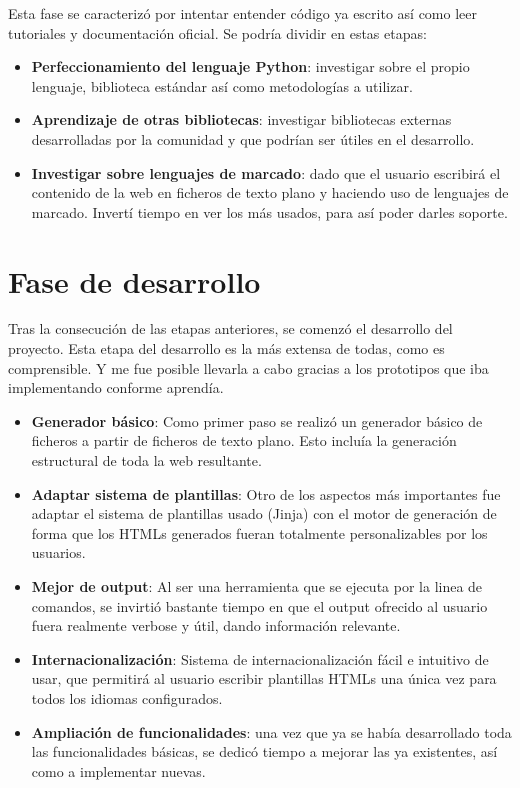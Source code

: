 Esta fase se caracterizó por intentar entender código ya escrito así como leer tutoriales y documentación
oficial. Se podría dividir en estas etapas:

\begin{itemize}
\item \textbf{Perfeccionamiento del lenguaje Python}: investigar sobre el propio lenguaje, biblioteca estándar
así como metodologías a utilizar.
\item \textbf{Aprendizaje de otras bibliotecas}: investigar bibliotecas externas desarrolladas por la comunidad y
que podrían ser útiles en el desarrollo.
\item \textbf{Investigar sobre lenguajes de marcado}: dado que el usuario escribirá el contenido de la web en ficheros
de texto plano y haciendo uso de lenguajes de marcado. Invertí tiempo en ver los más usados, para así poder
darles soporte.
\end{itemize}

\section{Fase de desarrollo}

Tras la consecución de las etapas anteriores, se comenzó el desarrollo del proyecto. Esta etapa del desarrollo
es la más extensa de todas, como es comprensible. Y me fue posible llevarla a cabo gracias a los
prototipos que iba implementando conforme aprendía.

\begin{itemize}
\item \textbf{Generador básico}: Como primer paso se realizó un generador básico de ficheros a partir
de ficheros de texto plano. Esto incluía la generación estructural de toda la web resultante.
\item \textbf{Adaptar sistema de plantillas}: Otro de los aspectos más importantes fue adaptar el sistema
de plantillas usado (Jinja) con el motor de generación de forma que los HTMLs generados fueran totalmente
personalizables por los usuarios.
\item \textbf{Mejor de output}: Al ser una herramienta que se ejecuta por la linea de comandos, se invirtió
bastante tiempo en que el output ofrecido al usuario fuera realmente verbose y útil, dando información relevante.
\item \textbf{Internacionalización}: Sistema de internacionalización fácil e intuitivo de usar, que permitirá al usuario
escribir plantillas HTMLs una única vez para todos los idiomas configurados.
\item \textbf{Ampliación de funcionalidades}: una vez que ya se había desarrollado toda las funcionalidades básicas,
se dedicó tiempo a mejorar las ya existentes, así como a implementar nuevas.
\end{itemize}


